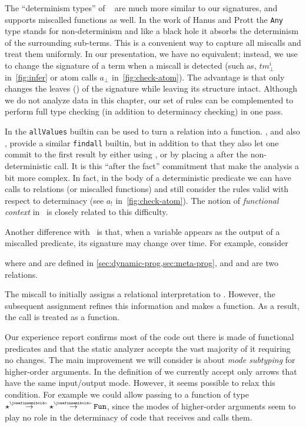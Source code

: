 The ``determinism types'' of \curry~\cite{hanus2025} are much more similar to
our signatures, and \curry supports miscalled functions as well.
In the work of Hanus and Prott the \texttt{Any} type stands for non-determinism
and like a black hole it absorbs the determinism
of the surrounding sub-terms. This is a convenient way to capture all miscalls
and treat them uniformly. In our presentation, we have no equivalent; instead,
we use \maximize to change the signature of a term when a miscall
is detected (such as, $tm_\bot^i$ in~\ref{fig:infer} or atom
calls $a_\bot$ in~\ref{fig:check-atom}). The advantage is that \maximize
only changes the leaves (\F) of the signature while leaving its structure
intact. Although we do not analyze data in this chapter, our set of rules can be
complemented to perform full type checking (in addition to determinacy
checking) in one pass.

In \curry the \texttt{allValues} builtin
can be used to turn a relation into a function. \prolog, and also \elpi,
provide a similar \texttt{findall} builtin, but in addition to that they
also let one commit to the first result by either using ,
or by placing a \cut after the non-deterministic call.
It is this ``after the fact'' commitment that make the analysis a bit more complex.
In fact, in the body of a deterministic predicate we can have
calls to relations (or miscalled functions) and still consider the rules
valid with respect to determinacy (see $a_!$ in~\ref{fig:check-atom}).
The notion of \textit{functional context} in~\cite{warren1989}
is closely related to this difficulty.

Another difference with~\cite{hanus2025} is that, when a variable appears as the
output of a miscalled predicate, its signature may change over time. For
example, consider 
\begin{center}
\end{center}
\noindent
where  and  are defined in
\cref{sec:dynamic-prog,sec:meta-prog}, and  and  are two
relations.

The miscall to  initially assigns a relational interpretation to
. However, the subsequent assignment  refines this
information and makes  a function. As a result, the call
 is treated as a function.

Our experience report confirms most of the \elpi code out there is made
of functional predicates and that the static analyzer accepts the vast
majority of it requiring no changes. The main improvement we will consider
is about \emph{mode subtyping} for higher-order arguments.
In the definition of \mySub we currently accept
only arrows that have the same input/output mode. However, it seems possible to
relax this condition. For example we could allow passing to 
a function of type $\star \toO \star \toO \detI$, since the modes
of higher-order arguments seem to play no role in the determinacy of
code that receives and calls them.



